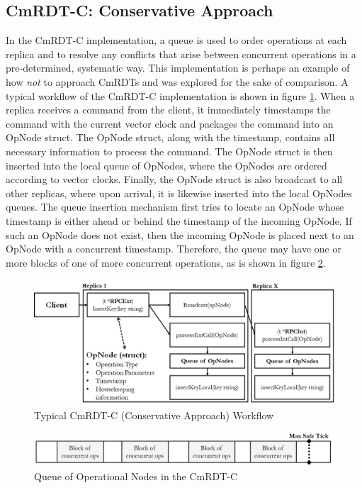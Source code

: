\documentclass[sigconf,nonacm,10pt]{acmart}
\begin{document}
\subsection{CmRDT-C: Conservative Approach}
In the CmRDT-C implementation, a queue is used to order operations at each replica and to resolve any conflicts that arise between concurrent operations in a pre-determined, systematic way. This implementation is perhaps an example of how \emph{not} to approach CmRDTs and was explored for the sake of comparison. A typical workflow of the CmRDT-C implementation is shown in figure \ref{fig:cmrdtq1}. When a replica receives a command from the client, it immediately timestamps the command with the current vector clock and packages the command into an OpNode struct. The OpNode struct, along with the timestamp, contains all necessary information to process the command. The OpNode struct is then inserted into the local queue of OpNodes, where the OpNodes are ordered according to vector clocks. Finally, the OpNode struct is also broadcast to all other replicas, where upon arrival, it is likewise inserted into the local OpNodes queues. The queue insertion mechanism first tries to locate an OpNode whose timestamp is either ahead or behind the timestamp of the incoming OpNode. If such an OpNode does not exist, then the incoming OpNode is placed next to an OpNode with a concurrent timestamp. Therefore, the queue may have one or more blocks of one of more concurrent operations, as is shown in figure \ref{fig:cmrdtq2}.

\begin{figure}[h]
  \centering
  \includegraphics[width=15.5cm]{Fig5CmRDTQ1}
  \caption{Typical CmRDT-C (Conservative Approach) Workflow}
  \label{fig:cmrdtq1}
\end{figure}

\begin{figure}[h]
  \centering
  \includegraphics[width=15.5cm]{Fig6CmRDTQ2}
  \caption{Queue of Operational Nodes in the CmRDT-C}
  \label{fig:cmrdtq2}
\end{figure}
\end{document}
